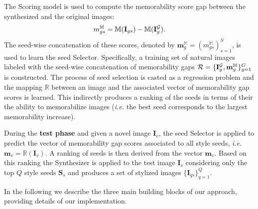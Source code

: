 \documentclass{sig-alternate-05-2015}
\begin{document}
The Scoring model is used to compute the memorability score gap between the synthesized and the original images:
\begin{equation}
m_{gs}^\mathbb{M} = \mathbb{M} (\mathbf{I}_{gs}) - \mathbb{M} (\mathbf{I}_g^{\cal G}).
\end{equation}
The seed-wise concatenation of these scores, denoted by $\mathbf{m}_g^\mathbb{M} = (m_{gs}^\mathbb{M})_{s=1}^S$, is used to learn the seed Selector. Specifically, a training set of natural images labeled with the seed-wise concatenation of memorability gaps ${\cal R}=\{\mathbf{I}_g^{\cal G},\mathbf{m}_g^\mathbb{M}\}_{g=1}^{G}$ is constructed. The process of seed selection is casted as a regression problem and the mapping $\mathbb{R}$ between an image and the associated vector of memorability gap scores is learned. This indirectly produces a ranking of the seeds in terms of their the ability to memorabilize images (\textit{i.e.} the best seed corresponds to the largest memorability increase).

During the \textbf{test phase} and given a novel image $\mathbf{I}_v$, the seed Selector is applied to predict the vector of memorability gap scores associated to all style seeds, \textit{i.e.} $\mathbf{m}_v=\mathbb{R}(\mathbf{I}_v)$. A ranking of seeds is then derived from the vector $\mathbf{m}_v$. Based on this ranking the Synthesizer is applied to the test image $\textbf{I}_v$ considering only the top $Q$ style seeds $\textbf{S}_s$ and produces a set of stylized images $\{\mathbf{I}_{qs}\}_{q=1}^Q$. %

In the following we describe the three main building blocks of our approach, providing details of our implementation.


\end{document}
